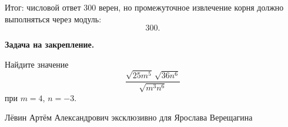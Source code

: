 \documentclass[12pt,a4paper]{article}
\begin{document}
\textcolor{teal!60!black}{Итог:} числовой ответ $300$ верен, но промежуточное извлечение корня должно выполняться через модуль:
\[
\boxed{300}.
\]

\textbf{Задача на закрепление.}

Найдите значение
\[
\frac{\sqrt{25m^5}\,\sqrt{36n^6}}{\sqrt{m^3n^6}}
\]
при $m=4$, $n=-3$.

\vfill
\begin{center}
\small Лёвин Артём Александрович эксклюзивно для Ярослава Верещагина
\end{center}

\end{document}
